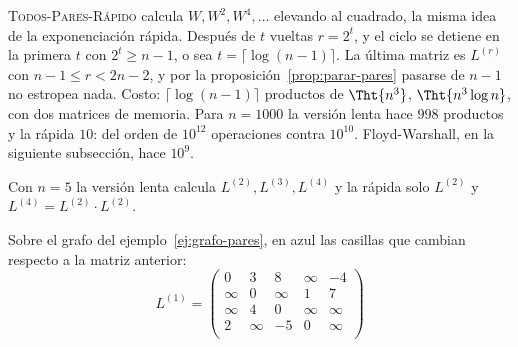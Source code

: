 \documentclass[11pt,letterpaper]{article}
\begin{document}
\textsc{Todos-Pares-Rápido} calcula $W, W^2, W^4, \dots$ elevando al
cuadrado, la misma idea de la exponenciación rápida. Después de $t$
vueltas $r = 2^t$, y el ciclo se detiene en la primera $t$ con
$2^t \ge n - 1$, o sea $t = \lceil \log(n - 1) \rceil$. La última
matriz es $L^{(r)}$ con $n - 1 \le r < 2n - 2$, y por la
proposición~\ref{prop:parar-pares} pasarse de $n - 1$ no estropea
nada. Costo: $\lceil \log(n - 1) \rceil$ productos de $\Tht{n^3}$,
$\Tht{n^3 \log n}$, con dos matrices de memoria. Para $n = 1000$ la
versión lenta hace $998$ productos y la rápida $10$: del orden de
$10^{12}$ operaciones contra $10^{10}$. Floyd-Warshall, en la
siguiente subsección, hace $10^9$.

\begin{ejemplo}
  \label{ej:cuadrados-pares}
  Con $n = 5$ la versión lenta calcula $L^{(2)}, L^{(3)}, L^{(4)}$ y
  la rápida solo $L^{(2)}$ y $L^{(4)} = L^{(2)} \cdot L^{(2)}$.
  \begin{center}
  \end{center}
  Sobre el grafo del ejemplo~\ref{ej:grafo-pares}, en azul las
  casillas que cambian respecto a la matriz anterior:
  {\small
  \setlength{\arraycolsep}{3.5pt}
  \[
  L^{(1)} = \begin{pmatrix}
    0 & 3 & 8 & \infty & -4 \\
    \infty & 0 & \infty & 1 & 7 \\
    \infty & 4 & 0 & \infty & \infty \\
    2 & \infty & -5 & 0 & \infty \\

\end{pmatrix}\]}
\end{ejemplo}
\end{document}
